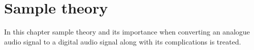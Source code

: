 \chapter{Sample theory} \label{ch6}
In this chapter sample theory and its importance when converting an analogue audio signal to a digital audio signal along with its complications is treated.
